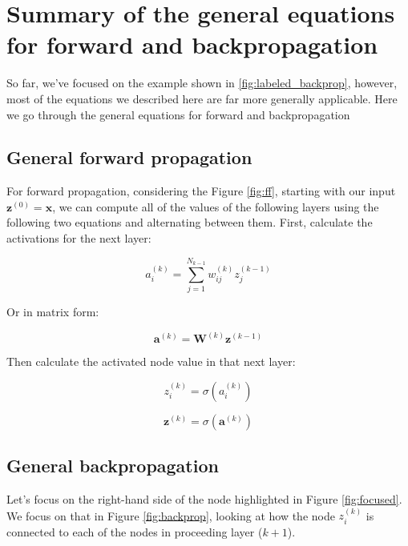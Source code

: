 \documentclass{article}
\begin{document}
\section{Summary of the general equations for forward and backpropagation}

So far, we've focused on the example shown in \ref{fig:labeled_backprop}, however, most of the equations we described here are far more generally applicable. Here we go through the general equations for forward and backpropagation

\subsection{General forward propagation}

For forward propagation, considering the Figure \ref{fig:ff}, starting with our input $\mathbf{z}^{(0)} = \mathbf{x}$, we can compute all of the values of the following layers using the following two equations and alternating between them. First, calculate the activations for the next layer:

\begin{equation}
    a_i^{(k)} = \sum_{j=1}^{N_{k-1}} w_{ij}^{(k)} z_j^{(k-1)} 
\end{equation}

Or in matrix form:

\begin{equation}
    \mathbf{a}^{(k)} = \mathbf{W}^{(k)} \mathbf{z}^{(k-1)}
\end{equation}

Then calculate the activated node value in that next layer:

\begin{equation}
    z_i^{(k)} = \sigma(a_i^{(k)})
\end{equation}

\begin{equation}
    \mathbf{z}^{(k)} = \sigma(\mathbf{a}^{(k)})
\end{equation}

\subsection{General backpropagation}

Let's focus on the right-hand side of the node highlighted in Figure \ref{fig:focused}. We focus on that in Figure \ref{fig:backprop}, looking at how the node $z_i^{(k)}$ is connected to each of the nodes in proceeding layer ($k+1$). 
\end{document}
